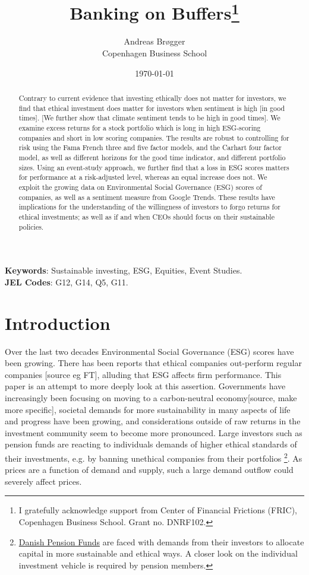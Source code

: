 \documentclass[11pt]{article}
\title{\Huge Banking on Buffers\thanks{I gratefully acknowledge support from Center of Financial Frictions (FRIC), Copenhagen Business School. Grant no. DNRF102.}}
\author{Andreas Br\o gger\\Copenhagen Business School
} %
\date{\today}         %
\begin{document}
\maketitle
\thispagestyle{empty} %

\begin{abstract}

\noindent Contrary to current evidence that investing ethically does not matter for investors, we find that ethical investment does matter for investors when sentiment is high [in good times]. [We further show that climate sentiment tends to be high in good times]. We examine excess returns for a stock portfolio which is long in high ESG-scoring companies and short in low scoring companies. The results are robust to controlling for risk using the Fama French three and five factor models, and the Carhart four factor model, as well as different horizons for the good time indicator, and different portfolio sizes. Using an event-study approach, we further find that a loss in ESG scores matters for performance at a risk-adjusted level, whereas an equal increase does not. We exploit the growing data on Environmental Social Governance (ESG) scores of companies, as well as a sentiment measure from Google Trends.  These results have implications for the understanding of the willingness of investors to forgo returns for ethical investments; as well as if and when CEOs should focus on their sustainable policies.
\end{abstract}

\noindent \textbf{Keywords}: Sustainable investing, ESG, Equities, Event Studies.\\
\noindent \textbf{JEL Codes}: G12, G14, Q5, G11.

\clearpage
\setcounter{footnote}{0}
\renewcommand{\thefootnote}{\arabic{footnote}}
\setcounter{page}{1}


\section{Introduction}
Over the last two decades Environmental Social Governance (ESG) scores have been growing. There has been reports that ethical companies out-perform regular companies [source eg FT], alluding that ESG affects firm performance. This paper is an attempt to more deeply look at this assertion. Governments have increasingly been focusing on moving to a carbon-neutral economy[source, make more specific], societal demands for more sustainability in many aspects of life and progress have been growing, and considerations outside of raw returns in the investment community seem to become more pronounced. Large investors such as pension funds are reacting to individuals demands of higher ethical standards of their investments, e.g. by banning unethical companies from their portfolios \footnote{\href{https://www.dr.dk/nyheder/indland/pensionskasser-vil-afvise-selskaber-med-daarlig-skattemoral}{Danish Pension Funds} are faced with demands from their investors to allocate capital in more sustainable and ethical ways. A closer look on the individual investment vehicle is required by pension members.}. As prices are a function of demand and supply, such a large demand outflow could severely affect prices.
\end{document}
